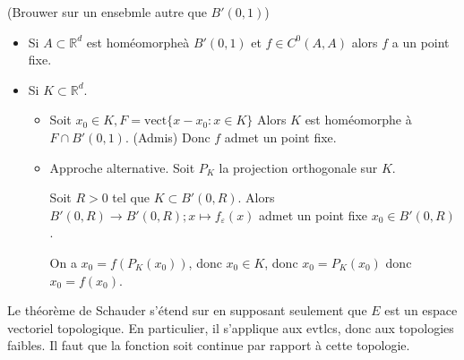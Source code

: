 \begin{remarque}
	(Brouwer sur un ensebmle autre que $B'\left( 0,1 \right) $)

	\begin{itemize}
		\item  Si $A \subset \mathbb{R}^d $ est homéomorpheà $B'\left( 0,1 \right) $ et $f \in C^0\left( A,A \right) $ alors $f$ a un point fixe.
		\item Si $K \subset \mathbb{R}^d $.
			\begin{itemize}
				\item Soit $x_0 \in K, F = \text{vect}\{x-x_0 : x \in K\} $
					Alors $K$ est homéomorphe à $F \cap B'\left( 0,1 \right) .$ (Admis)
					Donc $f$ admet un point fixe.
				\item Approche alternative. Soit $P_K$ la projection orthogonale sur $K$.

					Soit $R>0$ tel que $ K \subset B'\left( 0,R \right) .$ Alors $B'\left( 0,R \right) \to  B'\left( 0,R \right) ; x\mapsto f_{\varepsilon}\left( x \right) $ admet un point fixe $x_0 \in B'\left( 0,R \right) $ .

					On a $x_0 = f\left( P_K\left( x_0 \right)  \right) $, donc $x_0 \in K$, donc $x_0 = P_K\left( x_0 \right) $ donc $x_0 = f\left( x_0 \right) $.
			\end{itemize}
	\end{itemize}
\end{remarque}
\begin{remarque}
	Le théorème de Schauder s'étend sur en supposant seulement que $E$ est un espace vectoriel topologique. En particulier, il s'applique aux evtlcs, donc aux topologies faibles.  {\selectfont{}\relax} Il faut que la fonction soit continue par rapport à cette topologie.
\end{remarque}
	
